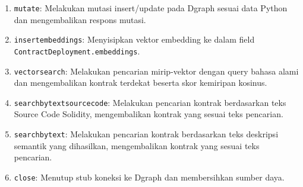 \begin{enumerate}
    \item \texttt{mutate}: Melakukan mutasi insert/update pada Dgraph sesuai data Python dan mengembalikan respons mutasi.
    \item \texttt{insert\textunderscore embeddings}: Menyisipkan vektor embedding ke dalam field \\\texttt{ContractDeployment.embeddings}.
    \item \texttt{vector\textunderscore search}: Melakukan pencarian mirip-vektor dengan query bahasa alami dan mengembalikan kontrak terdekat beserta skor kemiripan kosinus.
    \item \texttt{search\textunderscore by\textunderscore text\textunderscore source\textunderscore code}: Melakukan pencarian kontrak berdasarkan teks Source Code Solidity, mengembalikan kontrak yang sesuai teks pencarian.
    \item \texttt{search\textunderscore by\textunderscore text}: Melakukan pencarian kontrak berdasarkan teks deskripsi semantik yang dihasilkan, mengembalikan kontrak yang sesuai teks pencarian.
    \item \texttt{close}: Menutup stub koneksi ke Dgraph dan membersihkan sumber daya.
\end{enumerate}